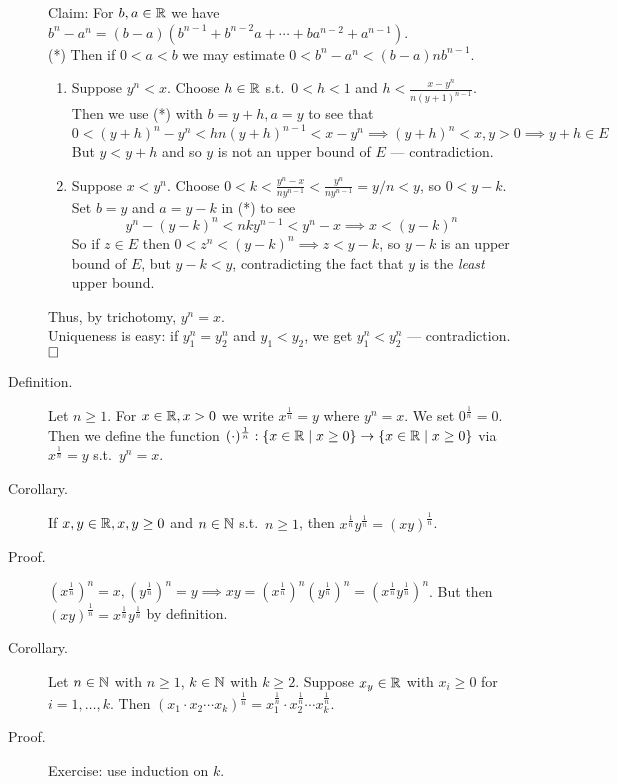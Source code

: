 \documentclass[letterpaper,11pt]{article}
\begin{document}
\begin{description}
    Claim: For $b,a\in\mathbb{R}$ we have
      $b^n-a^n=(b-a)(b^{n-1}+b^{n-2}a+\cdots+ba^{n-2}+a^{n-1})$.\\
    (*) Then if $0<a<b$ we may estimate $0<b^n-a^n<(b-a)nb^{n-1}$.
    \begin{enumerate}[1)]
    \item Suppose $y^n<x$. Choose $h\in\mathbb{R}$ s.t.\ $0<h<1$ and
      $h<\frac{x-y^n}{n(y+1)^{n-1}}$.
      Then we use (*) with $b=y+h,a=y$ to see that
      \[
      0<(y+h)^n-y^n<hn(y+h)^{n-1}<x-y^n \implies
      (y+h)^n<x,y>0 \implies y+h\in E
      \]
      But $y<y+h$ and so $y$ is not an upper bound of $E$ --- contradiction.
    \item Suppose $x<y^n$. Choose
        $0<k<\frac{y^n-x}{ny^{n-1}}<\frac{y^n}{ny^{n-1}}=y/n<y$,
        so $0<y-k$. Set $b=y$ and $a=y-k$ in (*) to see
        \[
        y^n-(y-k)^n<nky^{n-1}<y^n-x\implies x<(y-k)^n
        \]
        So if $z\in E$ then $0<z^n<(y-k)^n\implies z<y-k$,
        so $y-k$ is an upper bound of $E$, but $y-k<y$, contradicting
        the fact that $y$ is the \textit{least} upper bound.
    \end{enumerate}
    Thus, by trichotomy, $y^n=x$.\\
    Uniqueness is easy: if $y_1^n=y_2^n$
    and $y_1<y_2$, we get $y_1^n<y_2^n$ --- contradiction. $\hfill\square$


\item[Definition.] Let $n\ge1$. For $x\in\mathbb{R}, x>0$ we write $x^{\frac{1}{n}}=y$
    where $y^n=x$. We set $0^{\frac{1}{n}}=0$. Then we define the function
    $(\cdot)^{\frac{1}{n}}:\{x\in\mathbb{R}\;|\;x\ge0\}\rightarrow\{x\in\mathbb{R}\;|\;x\ge0\}$
    via $x^{\frac{1}{n}}=y$ s.t.\ $y^n=x$.

\item[Corollary.] If $x,y\in\mathbb{R}, x,y\ge0$ and $n\in\mathbb{N}$ s.t.\ $n\ge1$, then
  $x^{\frac{1}{n}}y^{\frac{1}{n}}=(xy)^{\frac{1}{n}}$.
\item[Proof.] $(x^{\frac{1}{n}})^n=x,(y^{\frac{1}{n}})^n=y\implies
    xy=(x^{\frac{1}{n}})^n(y^{\frac{1}{n}})^n=(x^{\frac{1}{n}}y^{\frac{1}{n}})^n$.
    But then $(xy)^{\frac{1}{n}}=x^{\frac{1}{n}}y^{\frac{1}{n}}$ by definition.

\item[Corollary.] Let $n\in\mathbb{N}$ with $n\ge1$, $k\in\mathbb{N}$ with $k\ge2$. Suppose
    $x_y\in\mathbb{R}$ with $x_i\ge0$ for $i=1,\ldots,k$. Then
    $(x_1\cdot x_2\cdots x_k)^{\frac{1}{n}}=
      x_1^{\frac{1}{n}}\cdot x_2^{\frac{1}{n}}\cdots x_k^{\frac{1}{n}}$.
\item[Proof.] Exercise: use induction on $k$.



\end{description}
\end{document}
